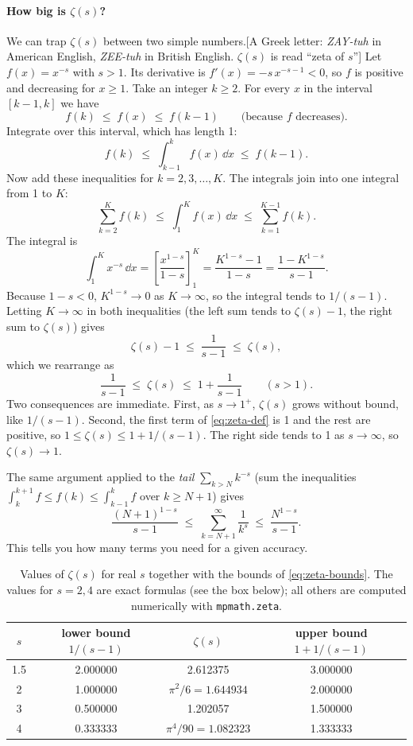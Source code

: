 \paragraph{How big is $\zeta(s)$?} We can trap $\zeta(s)$ between two simple numbers.[A Greek letter: \emph{ZAY-tuh} in American English, \emph{ZEE-tuh} in British English. $\zeta(s)$ is read ``zeta of $s$''] Let $f(x)=x^{-s}$ with $s>1$. Its derivative is $f'(x)=-s\,x^{-s-1}<0$, so $f$ is positive and decreasing for $x\ge1$. Take an integer $k\ge2$. For every $x$ in the interval $[k-1,k]$ we have
\[
f(k)\;\le\; f(x)\;\le\; f(k-1)\qquad\text{(because $f$ decreases)} .
\]
Integrate over this interval, which has length 1:
\[
f(k)\;\le\;\int_{k-1}^{k}f(x)\,\dd x\;\le\; f(k-1).
\]
Now add these inequalities for $k=2,3,\dots,K$. The integrals join into one integral from 1 to $K$:
\[
\sum_{k=2}^{K}f(k)\;\le\;\int_{1}^{K}f(x)\,\dd x\;\le\;\sum_{k=1}^{K-1}f(k).
\]
The integral is
\[
\int_1^K x^{-s}\,\dd x=\left[\frac{x^{1-s}}{1-s}\right]_1^K=\frac{K^{1-s}-1}{1-s}=\frac{1-K^{1-s}}{s-1}.
\]
Because $1-s<0$, $K^{1-s}\to0$ as $K\to\infty$, so the integral tends to $1/(s-1)$. Letting $K\to\infty$ in both inequalities (the left sum tends to $\zeta(s)-1$, the right sum to $\zeta(s)$) gives
\[
\zeta(s)-1\;\le\;\frac{1}{s-1}\;\le\;\zeta(s),
\]
which we rearrange as
\begin{equation}
\frac{1}{s-1}\;\le\;\zeta(s)\;\le\;1+\frac{1}{s-1}\qquad (s>1).
\label{eq:zeta-bounds}
\end{equation}
Two consequences are immediate. First, as $s\to1^{+}$, $\zeta(s)$ grows without bound, like $1/(s-1)$. Second, the first term of \cref{eq:zeta-def} is 1 and the rest are positive, so $1\le\zeta(s)\le1+1/(s-1)$. The right side tends to 1 as $s\to\infty$, so $\zeta(s)\to1$.

The same argument applied to the \emph{tail} $\sum_{k>N}k^{-s}$ (sum the inequalities $\int_k^{k+1}f\le f(k)\le\int_{k-1}^k f$ over $k\ge N+1$) gives
\begin{equation}
\frac{(N+1)^{1-s}}{s-1}\;\le\;\sum_{k=N+1}^{\infty}\frac{1}{k^s}\;\le\;\frac{N^{1-s}}{s-1}.
\label{eq:zeta-tail}
\end{equation}
This tells you how many terms you need for a given accuracy.

\begin{table}[htbp]\centering
\caption{Values of $\zeta(s)$ for real $s$ together with the bounds of \cref{eq:zeta-bounds}. The values for $s=2,4$ are exact formulas (see the box below); all others are computed numerically with \texttt{mpmath.zeta}.}
\label{tab:zeta-values}
\begin{tabular}{cccc}
\toprule
$s$ & lower bound $1/(s-1)$ & $\zeta(s)$ & upper bound $1+1/(s-1)$\\
\midrule
1.5 & 2.000000 & 2.612375 & 3.000000\\
2 & 1.000000 & $\pi^2/6=1.644934$ & 2.000000\\
3 & 0.500000 & 1.202057 & 1.500000\\
4 & 0.333333 & $\pi^4/90=1.082323$ & 1.333333\\
\bottomrule
\end{tabular}
\end{table}

